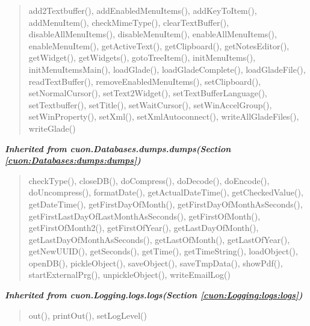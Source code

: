 \begin{quote}
add2Textbuffer(), addEnabledMenuItems(), addKeyToItem(), addMenuItem(), checkMimeType(), clearTextBuffer(), disableAllMenuItems(), disableMenuItem(), enableAllMenuItems(), enableMenuItem(), getActiveText(), getClipboard(), getNotesEditor(), getWidget(), getWidgets(), gotoTreeItem(), initMenuItems(), initMenuItemsMain(), loadGlade(), loadGladeComplete(), loadGladeFile(), readTextBuffer(), removeEnabledMenuItems(), setClipboard(), setNormalCursor(), setText2Widget(), setTextBufferLanguage(), setTextbuffer(), setTitle(), setWaitCursor(), setWinAccelGroup(), setWinProperty(), setXml(), setXmlAutoconnect(), writeAllGladeFiles(), writeGlade()
\end{quote}

\large{\textbf{\textit{Inherited from cuon.Databases.dumps.dumps\textit{(Section \ref{cuon:Databases:dumps:dumps})}}}}

\begin{quote}
checkType(), closeDB(), doCompress(), doDecode(), doEncode(), doUncompress(), formatDate(), getActualDateTime(), getCheckedValue(), getDateTime(), getFirstDayOfMonth(), getFirstDayOfMonthAsSeconds(), getFirstLastDayOfLastMonthAsSeconds(), getFirstOfMonth(), getFirstOfMonth2(), getFirstOfYear(), getLastDayOfMonth(), getLastDayOfMonthAsSeconds(), getLastOfMonth(), getLastOfYear(), getNewUUID(), getSeconds(), getTime(), getTimeString(), loadObject(), openDB(), pickleObject(), saveObject(), saveTmpData(), showPdf(), startExternalPrg(), unpickleObject(), writeEmailLog()
\end{quote}

\large{\textbf{\textit{Inherited from cuon.Logging.logs.logs\textit{(Section \ref{cuon:Logging:logs:logs})}}}}

\begin{quote}
out(), printOut(), setLogLevel()
\end{quote}
